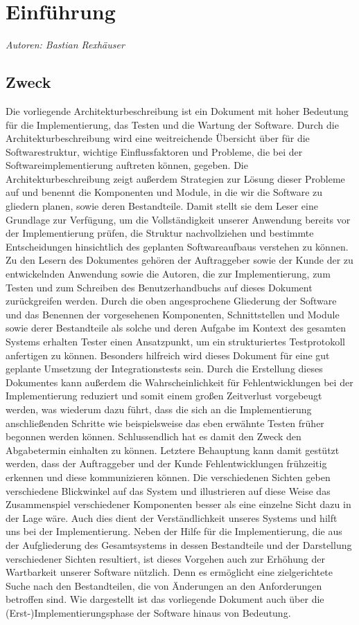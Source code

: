 \documentclass[enabledeprecatedfontcommands,fontsize=11pt,paper=a4,twoside]{scrartcl}
\newcounter{one}
\begin{document}
\newpage
\section{Einführung}
\emph{Autoren: Bastian Rexhäuser}
\subsection{Zweck}
Die vorliegende Architekturbeschreibung ist ein Dokument mit hoher Bedeutung für die Implementierung, das Testen und die Wartung der Software. Durch die Architekturbeschreibung wird eine weitreichende Übersicht über für die Softwarestruktur, wichtige Einflussfaktoren und Probleme, die bei der Softwareimplementierung auftreten können, gegeben. Die Architekturbeschreibung zeigt außerdem Strategien zur Lösung dieser Probleme auf und benennt die Komponenten und Module, in die wir die Software zu gliedern planen, sowie deren Bestandteile. Damit stellt sie dem Leser eine Grundlage zur Verfügung, um die Vollständigkeit unserer Anwendung bereits vor der Implementierung prüfen, die Struktur nachvollziehen und bestimmte Entscheidungen hinsichtlich des geplanten Softwareaufbaus verstehen zu können. Zu den Lesern des Dokumentes gehören der Auftraggeber sowie der Kunde der zu entwickelnden Anwendung sowie die Autoren, die zur Implementierung, zum Testen und zum Schreiben des Benutzerhandbuchs auf dieses Dokument zurückgreifen werden. Durch die oben angesprochene Gliederung der Software und das Benennen der vorgesehenen Komponenten, Schnittstellen und Module sowie derer Bestandteile als solche und deren Aufgabe im Kontext des gesamten Systems erhalten Tester einen Ansatzpunkt, um ein strukturiertes Testprotokoll anfertigen zu können. Besonders hilfreich wird dieses Dokument für eine gut geplante Umsetzung der Integrationstests sein. Durch die Erstellung dieses Dokumentes kann außerdem die Wahrscheinlichkeit für Fehlentwicklungen bei der Implementierung reduziert und somit einem großen Zeitverlust vorgebeugt werden, was wiederum dazu führt, dass die sich an die Implementierung anschließenden Schritte wie beispielsweise das eben erwähnte Testen früher begonnen werden können. Schlussendlich hat es damit den Zweck den Abgabetermin einhalten zu können. Letztere Behauptung kann damit gestützt werden,  dass der Auftraggeber und der Kunde Fehlentwicklungen frühzeitig erkennen und diese kommunizieren können. Die verschiedenen Sichten geben verschiedene Blickwinkel auf das System und illustrieren auf diese Weise das Zusammenspiel verschiedener Komponenten besser als eine einzelne Sicht dazu in der Lage wäre. Auch dies dient der Verständlichkeit unseres Systems und hilft uns bei der Implementierung. Neben der Hilfe für die Implementierung, die aus der Aufgliederung des Gesamtsystems in dessen Bestandteile und der Darstellung verschiedener Sichten resultiert, ist dieses Vorgehen auch zur Erhöhung der Wartbarkeit unserer Software nützlich. Denn es ermöglicht eine zielgerichtete Suche nach den Bestandteilen, die von Änderungen an den Anforderungen betroffen sind. Wie dargestellt ist das vorliegende Dokument auch über die (Erst-)Implementierungsphase der Software hinaus von Bedeutung.
\newpage
\end{document}
